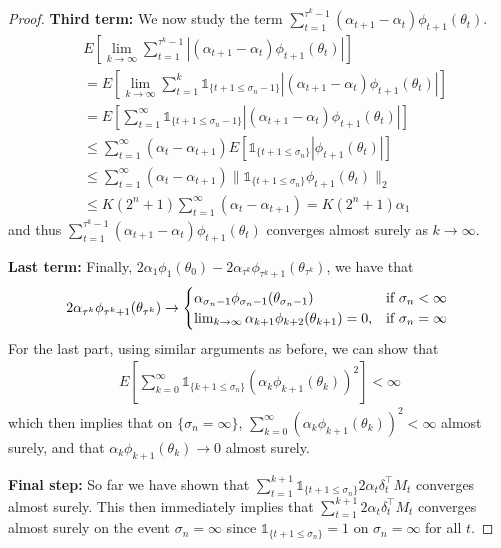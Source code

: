 \documentclass[11pt]{article}
\begin{document}
\begin{proof}

{\bf Third term:} We now study the term $ \sum_{t=1}^{\tau^k-1} (\alpha_{t+1}-\alpha_t) \phi_{t+1}(\theta_t) $. 
\begin{align*}
  &E\left[\lim_{k\to\infty}\sum_{t=1}^{\tau^k-1} \left|(\alpha_{t+1}-\alpha_t) \phi_{t+1}(\theta_t)\right| \right]\\
   &= E\left[\lim_{k\to\infty}\sum_{t=1}^{k} \mathds{1}_{\{t+1\leq\sigma_n-1\}}\left|(\alpha_{t+1}-\alpha_t) \phi_{t+1}(\theta_t)\right| \right]\\
 &= E\left[\sum_{t=1}^{\infty} \mathds{1}_{\{t+1\leq\sigma_n-1\}}\left|(\alpha_{t+1}-\alpha_t) \phi_{t+1}(\theta_t)\right| \right]\\
 & \leq\sum_{t=1}^\infty (\alpha_t-\alpha_{t+1}) E\left[ \mathds{1}_{\{t+1\leq\sigma_n\}}\left|\phi_{t+1}(\theta_t)\right| \right]\\
 &\leq \sum_{t=1}^\infty (\alpha_t-\alpha_{t+1}) \|\mathds{1}_{\{t+1\leq\sigma_n\}}\phi_{t+1}(\theta_t)\|_2\\
 &\leq K (2^n+1)\sum_{t=1}^\infty (\alpha_t-\alpha_{t+1}) = K (2^n+1)\alpha_1
\end{align*}
and thus $\sum_{t=1}^{\tau^k-1} (\alpha_{t+1}-\alpha_t) \phi_{t+1}(\theta_t) $ converges almost surely as $k\to\infty$.



{\bf Last term:} Finally, $2\alpha_1 \phi_1(\theta_0) - 2\alpha_{\tau^k} \phi_{\tau^k+1}(\theta_{\tau^k})$, we have that  
\begin{align*}
 2\alpha_{\tau^k} \phi_{\tau^k+1}(\theta_{\tau^k}) \to \begin{cases}
 \alpha_{\sigma_n-1}\phi_{\sigma_n-1}(\theta_{\sigma_n-1}) &\text{if $ \sigma_n<\infty$ }\\
            \lim_{k\to\infty}\alpha_{k+1}\phi_{k+2}(\theta_{k+1})=0, & \text{if $\sigma_n=\infty$}
 \end{cases}
\end{align*}
For the last part, using similar arguments as before, we can show that 
\begin{align*}
E[\sum_{k=0}^\infty \mathds{1}_{\{ k+1\leq \sigma_n\}}  \left( \alpha_{k} \phi_{k+1}(\theta_{k})\right)^2 ]<\infty
\end{align*}
which then implies that on $\{\sigma_n=\infty\}$, $\sum_{k=0}^\infty   \left( \alpha_{k} \phi_{k+1}(\theta_{k})\right)^2 <\infty$ almost surely, and that $ \alpha_{k} \phi_{k+1}(\theta_{k})\to 0$ almost surely. 

{\bf Final step:} So far we have shown that
$
\sum_{t=1}^{k+1} \mathds{1}_{\{t+1\leq \sigma_n\}}2\alpha_t \delta_t^\intercal M_t 
$
converges almost surely.  This then immediately implies that $ \sum_{t=1}^{k+1} 2\alpha_t \delta_t^\intercal M_t $ converges almost surely on the event $\sigma_n=\infty$ since $\mathds{1}_{\{t+1\leq \sigma_n\}}=1$ on  $\sigma_n=\infty$  for all $t$.

\end{proof}
\end{document}
